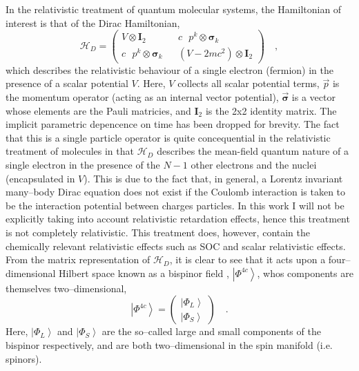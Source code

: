 \documentclass[12pt]{article}
\newcommand{\ket}[1]{\left\vert #1 \right\rangle}         %
\newcommand*\vc[1]{\boldsymbol{#1}}
\newcommand*\op[1]{\mathcal{#1}}
\begin{document}
In the relativistic treatment of quantum molecular systems, the Hamiltonian
of interest is that of the Dirac Hamiltonian,
\begin{equation}
\op{H}_D = 
\begin{pmatrix}
  V \otimes \vc{I}_2 && c \text { } p^k \otimes \vc{\sigma}_k \\
  c \text { } p^k \otimes \vc{\sigma}_k && (V - 2mc^2) \otimes \vc{I}_2
\end{pmatrix} \quad ,
\label{eq:DiracHam}
\end{equation}
which describes the relativistic behaviour of a single electron (fermion) in the
presence of a scalar potential $V$. Here, $V$ collects all scalar potential
terms, $\vec{p}$ is the momentum operator (acting as an internal vector
potential), $\vec{\vc{\sigma}}$ is a vector whose elements are the Pauli
matricies, and $\vc{I}_2$ is the 2x2 identity matrix. The implicit parametric
depencence on time has been dropped for brevity. The fact that this is a single
particle operator is quite concequential in the relativistic treatment of
molecules in that $\op{H}_D$ describes the mean-field quantum nature of a
single electron in the presence of the $N-1$ other electrons and the nuclei
(encapsulated in $V$). This is due to the fact that, in general, a Lorentz
invariant many--body Dirac equation does not exist if the Coulomb interaction is
taken to be the interaction potential between charges particles. In this work I
will not be explicitly taking into account relativistic retardation effects,
hence this treatment is not completely relativistic. This treatment does,
however, contain the chemically relevant relativistic effects such as
SOC and  scalar relativistic effects.
From the matrix representation of $\op{H}_D$, it is clear to see that it
acts upon a four--dimensional Hilbert space known as a bispinor field ,
$\ket{\Phi^{4c}}$, whos components are themselves two--dimensional,
\begin{equation}
\ket{\Phi^{4c}} = \begin{pmatrix}
 \ket{\Phi_L} \\ \ket{\Phi_S}
\end{pmatrix} \quad.
\end{equation}
Here, $\ket{\Phi_L}$ and $\ket{\Phi_S}$ are the so--called large and small
components of the bispinor respectively, and are both two--dimensional in the
spin manifold (i.e. spinors).
\end{document}

